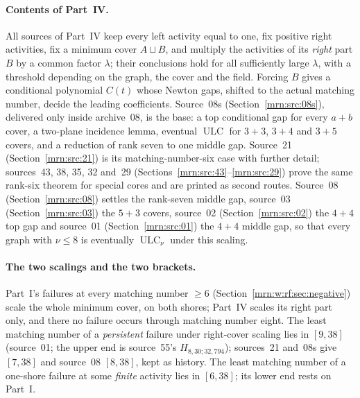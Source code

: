 \documentclass[11pt,a4paper]{article}
\theoremstyle{remark}\newtheorem{remark}[theorem]{Remark}
\newcommand{\ULC}{\operatorname{ULC}}      %
\begin{document}
\paragraph{Contents of Part~IV.}
All sources of Part~IV keep every left activity equal to one, fix positive
right activities, fix a minimum cover $A\sqcup B$, and multiply the
activities of its \emph{right} part $B$ by a common factor $\lambda$; their
conclusions hold for all sufficiently large $\lambda$, with a threshold
depending on the graph, the cover and the field. Forcing $B$ gives a
conditional polynomial $C(t)$ whose Newton gaps, shifted to the actual
matching number, decide the leading coefficients. Source~08s
(Section~\ref{mrn:src:08s}), delivered only inside archive~08, is the base:
a top conditional gap for every $a+b$ cover, a two-plane incidence lemma,
eventual $\ULC$ for $3+3$, $3+4$ and $3+5$ covers, and a reduction of rank
seven to one middle gap. Source~21 (Section~\ref{mrn:src:21}) is its
matching-number-six case with further detail; sources~43, 38, 35, 32 and~29
(Sections~\ref{mrn:src:43}--\ref{mrn:src:29}) prove the same rank-six
theorem for special cores and are printed as second routes. Source~08
(Section~\ref{mrn:src:08}) settles the rank-seven middle gap, source~03
(Section~\ref{mrn:src:03}) the $5+3$ covers, source~02
(Section~\ref{mrn:src:02}) the $4+4$ top gap and source~01
(Section~\ref{mrn:src:01}) the $4+4$ middle gap, so that every graph with
$\nu\le8$ is eventually $\ULC_\nu$ under this scaling.

\paragraph{The two scalings and the two brackets.}
Part~I's failures at every matching number $\ge6$
(Section~\ref{mrn:w:rf:sec:negative}) scale the whole minimum cover, on both
shores; Part~IV scales its right part only, and there no failure occurs
through matching number eight. The least matching number of a
\emph{persistent} failure under right-cover scaling lies in $[9,38]$
(source~01; the upper end is source~55's $H_{8,30;32,794}$); sources~21 and~08s
give $[7,38]$ and source~08 $[8,38]$, kept as history. The least matching
number of a one-shore failure at some \emph{finite} activity lies in
$[6,38]$; its lower end rests on Part~I.
\end{document}
